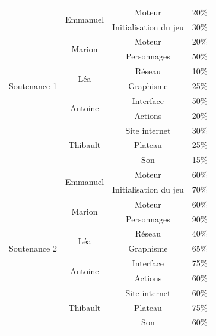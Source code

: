 \documentclass[12pt]{extarticle}
\begin{document}
\begin{table}[!ht]
	\begin{center}
		\begin{tabular}{ | c | c | c | c | }
			\hline
			\multirow{11}{*}{Soutenance 1} & \multirow{2}{*}{Emmanuel} & Moteur & 20\% \\ \cline{3-4}
			&& Initialisation du jeu & 30\% \\ \cline{2-4}
			& \multirow{2}{*}{Marion} & Moteur & 20\% \\ \cline{3-4}
			&& Personnages & 50\% \\ \cline{2-4}
			& \multirow{2}{*}{Léa} & Réseau & 10\% \\ \cline{3-4}
			&& Graphisme & 25\% \\ \cline{2-4}
			& \multirow{2}{*}{Antoine} & Interface & 50\% \\ \cline{3-4}
			&& Actions & 20\% \\ \cline{2-4}
			& \multirow{3}{*}{Thibault} & Site internet & 30\% \\ \cline{3-4}
			&& Plateau & 25\% \\ \cline{3-4}
			&& Son & 15\% \\ \hline \hline

			\multirow{11}{*}{Soutenance 2} & \multirow{2}{*}{Emmanuel} & Moteur & 60\% \\ \cline{3-4}
			&& Initialisation du jeu & 70\% \\ \cline{2-4}
			& \multirow{2}{*}{Marion} & Moteur & 60\% \\ \cline{3-4}
			&& Personnages & 90\% \\ \cline{2-4}
			& \multirow{2}{*}{Léa} & Réseau & 40\% \\ \cline{3-4}
			&& Graphisme & 65\% \\ \cline{2-4}
			& \multirow{2}{*}{Antoine} & Interface & 75\% \\ \cline{3-4}
			&& Actions & 60\% \\ \cline{2-4}
			& \multirow{3}{*}{Thibault} & Site internet & 60\% \\ \cline{3-4}
			&& Plateau & 75\% \\ \cline{3-4}
			&& Son & 60\% \\ \hline \hline
			

\end{tabular}
\end{center}
\end{table}
\end{document}
